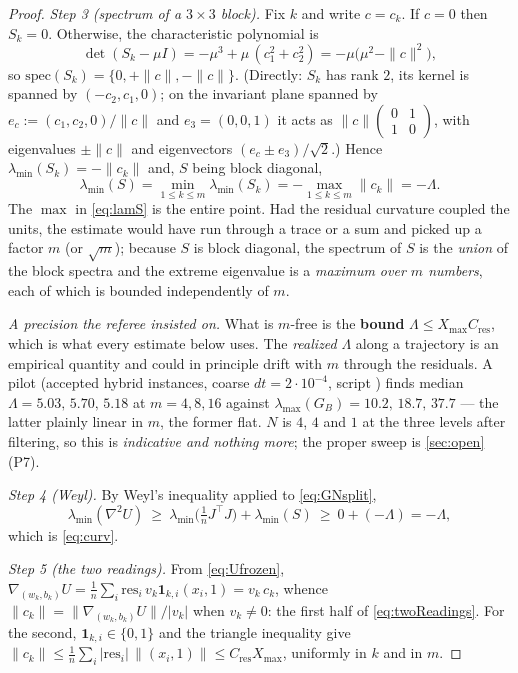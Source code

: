\documentclass[11pt]{article}
\theoremstyle{remark}
\newcommand{\res}{\mathrm{res}}
\newcommand{\Cres}{C_{\mathrm{res}}}
\newcommand{\Xmax}{X_{\max}}
\begin{document}
\begin{proof}
\smallskip
\emph{Step 3 (spectrum of a $3\times3$ block).} Fix $k$ and write $c=c_k$. If
$c=0$ then $S_k=0$. Otherwise, the characteristic polynomial is
\[
\det(S_k-\mu I)
=-\mu^3+\mu\,(c_1^2+c_2^2)
=-\mu\bigl(\mu^2-\|c\|^2\bigr),
\]
so $\mathrm{spec}(S_k)=\{0,+\|c\|,-\|c\|\}$. (Directly: $S_k$ has rank $2$, its
kernel is spanned by $(-c_2,c_1,0)$; on the invariant plane spanned by
$e_c:=(c_1,c_2,0)/\|c\|$ and $e_3=(0,0,1)$ it acts as
$\|c\|\left(\begin{smallmatrix}0&1\\1&0\end{smallmatrix}\right)$, with eigenvalues
$\pm\|c\|$ and eigenvectors $(e_c\pm e_3)/\sqrt2$.) Hence
$\lambda_{\min}(S_k)=-\|c_k\|$ and, $S$ being block diagonal,
\begin{equation}\label{eq:lamS}
\lambda_{\min}(S)=\min_{1\le k\le m}\lambda_{\min}(S_k)
=-\max_{1\le k\le m}\|c_k\|=-\Lambda .
\end{equation}
The $\max$ in \eqref{eq:lamS} is the entire point. Had the residual curvature
coupled the units, the estimate would have run through a trace or a sum and
picked up a factor $m$ (or $\sqrt m$); because $S$ is block diagonal, the
spectrum of $S$ is the \emph{union} of the block spectra and the extreme
eigenvalue is a \emph{maximum over $m$ numbers}, each of which is bounded
independently of $m$.

\emph{A precision the referee insisted on.} What is $m$-free is the
\textbf{bound} $\Lambda\le\Xmax\Cres$, which is what every estimate below uses.
The \emph{realized} $\Lambda$ along a trajectory is an empirical quantity and
could in principle drift with $m$ through the residuals. A pilot (accepted
hybrid instances, coarse $dt=2\cdot10^{-4}$, script )
finds median $\Lambda=5.03,\,5.70,\,5.18$ at $m=4,8,16$ against
$\lambda_{\max}(G_B)=10.2,\,18.7,\,37.7$ --- the latter plainly linear in $m$,
the former flat. $N$ is $4$, $4$ and $1$ at the three levels after filtering, so
this is \emph{indicative and nothing more}; the proper sweep is
\cref{sec:open}\,(P7).

\smallskip
\emph{Step 4 (Weyl).} By Weyl's inequality applied to \eqref{eq:GNsplit},
\[
\lambda_{\min}(\nabla^2U)\ \ge\ \lambda_{\min}\bigl(\tfrac1nJ^\top J\bigr)+\lambda_{\min}(S)
\ \ge\ 0+(-\Lambda)=-\Lambda,
\]
which is \eqref{eq:curv}.

\smallskip
\emph{Step 5 (the two readings).} From \eqref{eq:Ufrozen},
$\nabla_{(w_k,b_k)}U=\frac1n\sum_i\res_i\,v_k\mathbf1_{k,i}(x_i,1)=v_k\,c_k$,
whence $\|c_k\|=\|\nabla_{(w_k,b_k)}U\|/|v_k|$ when $v_k\ne0$: the first half of
\eqref{eq:twoReadings}. For the second, $\mathbf1_{k,i}\in\{0,1\}$ and the
triangle inequality give
$\|c_k\|\le\frac1n\sum_i|\res_i|\,\|(x_i,1)\|\le\Cres\Xmax$, uniformly in $k$
and in $m$.
\end{proof}
\end{document}
